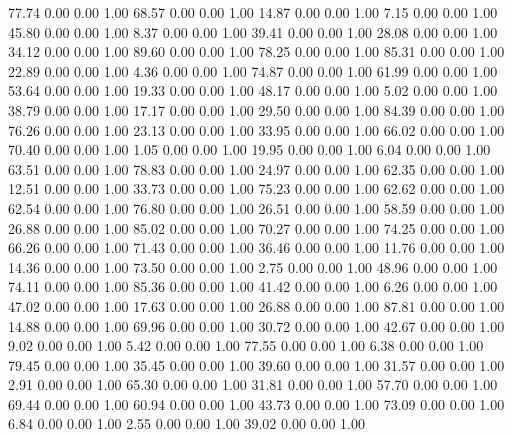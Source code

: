    77.74   0.00   0.00   1.00
   68.57   0.00   0.00   1.00
   14.87   0.00   0.00   1.00
    7.15   0.00   0.00   1.00
   45.80   0.00   0.00   1.00
    8.37   0.00   0.00   1.00
   39.41   0.00   0.00   1.00
   28.08   0.00   0.00   1.00
   34.12   0.00   0.00   1.00
   89.60   0.00   0.00   1.00
   78.25   0.00   0.00   1.00
   85.31   0.00   0.00   1.00
   22.89   0.00   0.00   1.00
    4.36   0.00   0.00   1.00
   74.87   0.00   0.00   1.00
   61.99   0.00   0.00   1.00
   53.64   0.00   0.00   1.00
   19.33   0.00   0.00   1.00
   48.17   0.00   0.00   1.00
    5.02   0.00   0.00   1.00
   38.79   0.00   0.00   1.00
   17.17   0.00   0.00   1.00
   29.50   0.00   0.00   1.00
   84.39   0.00   0.00   1.00
   76.26   0.00   0.00   1.00
   23.13   0.00   0.00   1.00
   33.95   0.00   0.00   1.00
   66.02   0.00   0.00   1.00
   70.40   0.00   0.00   1.00
    1.05   0.00   0.00   1.00
   19.95   0.00   0.00   1.00
    6.04   0.00   0.00   1.00
   63.51   0.00   0.00   1.00
   78.83   0.00   0.00   1.00
   24.97   0.00   0.00   1.00
   62.35   0.00   0.00   1.00
   12.51   0.00   0.00   1.00
   33.73   0.00   0.00   1.00
   75.23   0.00   0.00   1.00
   62.62   0.00   0.00   1.00
   62.54   0.00   0.00   1.00
   76.80   0.00   0.00   1.00
   26.51   0.00   0.00   1.00
   58.59   0.00   0.00   1.00
   26.88   0.00   0.00   1.00
   85.02   0.00   0.00   1.00
   70.27   0.00   0.00   1.00
   74.25   0.00   0.00   1.00
   66.26   0.00   0.00   1.00
   71.43   0.00   0.00   1.00
   36.46   0.00   0.00   1.00
   11.76   0.00   0.00   1.00
   14.36   0.00   0.00   1.00
   73.50   0.00   0.00   1.00
    2.75   0.00   0.00   1.00
   48.96   0.00   0.00   1.00
   74.11   0.00   0.00   1.00
   85.36   0.00   0.00   1.00
   41.42   0.00   0.00   1.00
    6.26   0.00   0.00   1.00
   47.02   0.00   0.00   1.00
   17.63   0.00   0.00   1.00
   26.88   0.00   0.00   1.00
   87.81   0.00   0.00   1.00
   14.88   0.00   0.00   1.00
   69.96   0.00   0.00   1.00
   30.72   0.00   0.00   1.00
   42.67   0.00   0.00   1.00
    9.02   0.00   0.00   1.00
    5.42   0.00   0.00   1.00
   77.55   0.00   0.00   1.00
    6.38   0.00   0.00   1.00
   79.45   0.00   0.00   1.00
   35.45   0.00   0.00   1.00
   39.60   0.00   0.00   1.00
   31.57   0.00   0.00   1.00
    2.91   0.00   0.00   1.00
   65.30   0.00   0.00   1.00
   31.81   0.00   0.00   1.00
   57.70   0.00   0.00   1.00
   69.44   0.00   0.00   1.00
   60.94   0.00   0.00   1.00
   43.73   0.00   0.00   1.00
   73.09   0.00   0.00   1.00
    6.84   0.00   0.00   1.00
    2.55   0.00   0.00   1.00
   39.02   0.00   0.00   1.00
